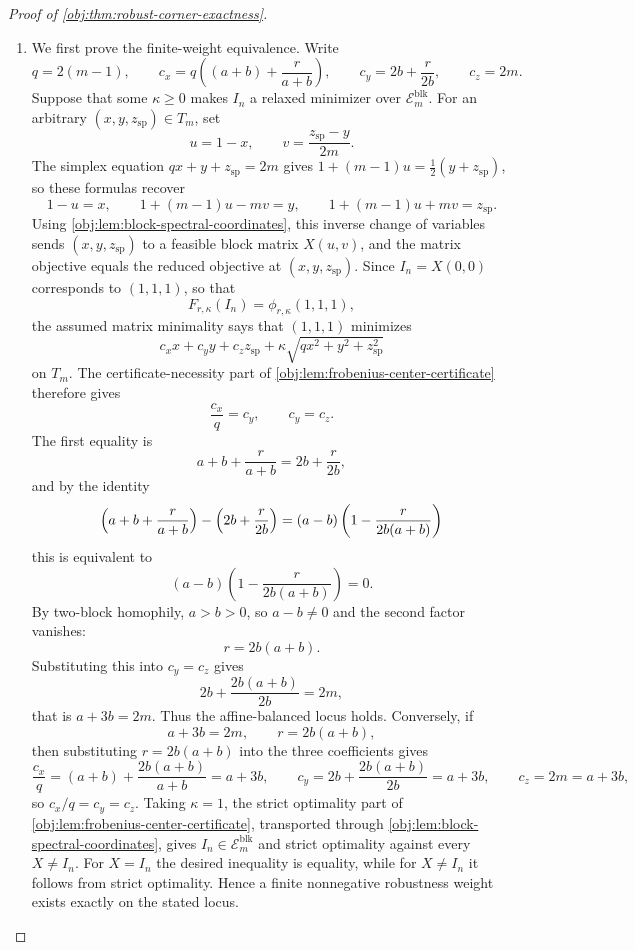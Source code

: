 \begin{proof}[Proof of \cref{obj:thm:robust-corner-exactness}]
\begin{enumerate}
\item We first prove the finite-weight equivalence.  Write
\[
q=2(m-1),\qquad
c_x=q\left((a+b)+\frac r{a+b}\right),\qquad
c_y=2b+\frac r{2b},\qquad
c_z=2m .
\]
Suppose that some \(\kappa\ge 0\) makes \(I_n\) a relaxed minimizer over
\(\mathcal E_m^{\mathrm{blk}}\).  For an arbitrary
\((x,y,z_{\mathrm{sp}})\in T_m\), set
\[
u=1-x,\qquad v=\frac{z_{\mathrm{sp}}-y}{2m}.
\]
The simplex equation \(qx+y+z_{\mathrm{sp}}=2m\) gives \(1+(m-1)u=\tfrac12(y+z_{\mathrm{sp}})\), so these formulas recover
\[
1-u=x,\qquad
1+(m-1)u-mv=y,\qquad
1+(m-1)u+mv=z_{\mathrm{sp}} .
\]
Using \cref{obj:lem:block-spectral-coordinates}, this inverse change of variables sends
\((x,y,z_{\mathrm{sp}})\) to a feasible block matrix \(X(u,v)\), and the matrix
objective equals the reduced objective at \((x,y,z_{\mathrm{sp}})\).  Since
\(I_n=X(0,0)\) corresponds to \((1,1,1)\), so that
\[
F_{r,\kappa}(I_n)=\phi_{r,\kappa}(1,1,1),
\]
the assumed matrix minimality says that
\((1,1,1)\) minimizes
\[
c_xx+c_yy+c_zz_{\mathrm{sp}}
+\kappa\sqrt{q x^2+y^2+z_{\mathrm{sp}}^2}
\]
on \(T_m\).  The certificate-necessity part of
\cref{obj:lem:frobenius-center-certificate} therefore gives
\[
\frac{c_x}{q}=c_y,\qquad c_y=c_z .
\]
The first equality is
\[
a+b+\frac r{a+b}=2b+\frac r{2b},
\]
and by the identity
\[
\Bigl(a+b+\frac r{a+b}\Bigr)-\Bigl(2b+\frac r{2b}\Bigr)
=(a-b)\left(1-\frac{r}{2b(a+b)}\right)
\]
this is equivalent to
\[
(a-b)\left(1-\frac{r}{2b(a+b)}\right)=0.
\]
By two-block homophily, \(a>b>0\), so \(a-b\ne0\) and the second factor vanishes:
\[
r=2b(a+b).
\]
Substituting this into \(c_y=c_z\) gives
\[
2b+\frac{2b(a+b)}{2b}=2m,
\]
that is \(a+3b=2m\).  Thus the affine-balanced locus holds. %
Conversely, if
\[
a+3b=2m,\qquad r=2b(a+b),
\]
then substituting \(r=2b(a+b)\) into the three coefficients gives
\[
\frac{c_x}{q}=(a+b)+\frac{2b(a+b)}{a+b}=a+3b,
\qquad
c_y=2b+\frac{2b(a+b)}{2b}=a+3b,
\qquad
c_z=2m=a+3b,
\]
so \(c_x/q=c_y=c_z\). %
Taking \(\kappa=1\), the strict
optimality part of \cref{obj:lem:frobenius-center-certificate}, transported through
\cref{obj:lem:block-spectral-coordinates}, gives \(I_n\in\mathcal E_m^{\mathrm{blk}}\)
and strict optimality against every \(X\ne I_n\).  For \(X=I_n\) the desired inequality
is equality, while for \(X\ne I_n\) it follows from strict optimality.  Hence a finite
nonnegative robustness weight exists exactly on the stated locus. %


\end{enumerate}
\end{proof}
